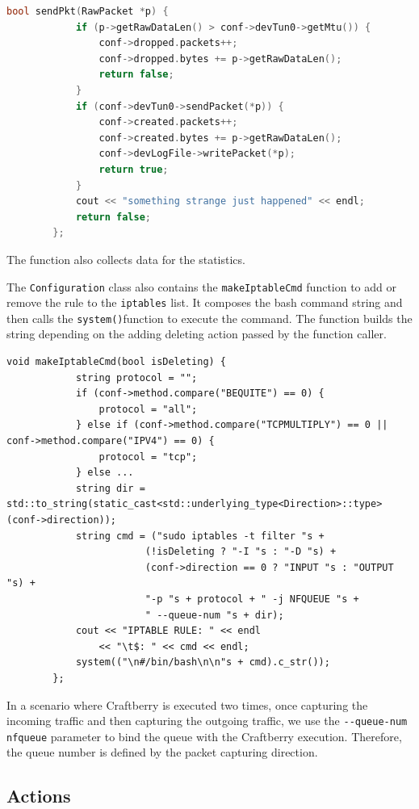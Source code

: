 \documentclass[12pt]{article}
\begin{document}
	\bigbreak

	\begin{lstlisting}[frame=single, language=C++]
		bool sendPkt(RawPacket *p) {
			if (p->getRawDataLen() > conf->devTun0->getMtu()) {
				conf->dropped.packets++;
				conf->dropped.bytes += p->getRawDataLen();
				return false;
			}
			if (conf->devTun0->sendPacket(*p)) {
				conf->created.packets++;
				conf->created.bytes += p->getRawDataLen();
				conf->devLogFile->writePacket(*p);
				return true;
			}
			cout << "something strange just happened" << endl;
			return false;
		};
	\end{lstlisting}
	\bigbreak
	The function also collects data for the statistics.
	\bigbreak

	The \lstinline{Configuration} class also contains the \lstinline{makeIptableCmd} function to add or remove the rule to the \lstinline{iptables} list. It composes the bash command string and then calls the \lstinline{system()}function to execute the command. The function builds the string depending on the adding deleting action passed by the function caller.\\
	
	\bigbreak

	\begin{lstlisting}[frame=single]
		void makeIptableCmd(bool isDeleting) {
			string protocol = "";
			if (conf->method.compare("BEQUITE") == 0) {
				protocol = "all";
			} else if (conf->method.compare("TCPMULTIPLY") == 0 || conf->method.compare("IPV4") == 0) {
				protocol = "tcp";
			} else ...
			string dir = std::to_string(static_cast<std::underlying_type<Direction>::type>(conf->direction));
			string cmd = ("sudo iptables -t filter "s +
						(!isDeleting ? "-I "s : "-D "s) +
						(conf->direction == 0 ? "INPUT "s : "OUTPUT "s) +
						"-p "s + protocol + " -j NFQUEUE "s +
						" --queue-num "s + dir);
			cout << "IPTABLE RULE: " << endl
				<< "\t$: " << cmd << endl;
			system(("\n#/bin/bash\n\n"s + cmd).c_str());
		};
	\end{lstlisting}
	\bigbreak

	In a scenario where Craftberry is executed two times, once capturing the incoming traffic and then capturing the outgoing traffic, we use the \lstinline{--queue-num nfqueue} parameter to bind the queue with the Craftberry execution. Therefore, the queue number is defined by the packet capturing direction.

	\subsection{Actions}
\end{document}
